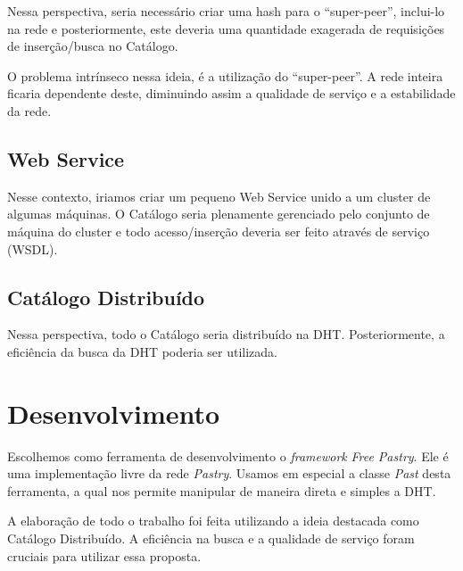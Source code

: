 \documentclass{acm_proc_article-sp}
\begin{document}
Nessa perspectiva, seria necessário criar uma hash para o “super-peer”, inclui-lo na rede e posteriormente, este deveria uma quantidade exagerada de requisições de inserção/busca no Catálogo.

O problema intrínseco nessa ideia, é a utilização do “super-peer”. A rede inteira ficaria dependente deste, diminuindo assim a qualidade de serviço e a estabilidade da rede.

\subsection{Web Service}

Nesse contexto, iriamos criar um pequeno Web Service unido a um cluster de algumas máquinas. O Catálogo seria plenamente gerenciado pelo conjunto de máquina do cluster e todo acesso/inserção deveria ser feito através de serviço (WSDL).

\subsection{Catálogo Distribuído}

Nessa perspectiva, todo o Catálogo seria distribuído na DHT. Posteriormente, a 
eficiência da  busca da DHT poderia ser utilizada.

\section{Desenvolvimento}

Escolhemos como ferramenta de desenvolvimento o \textit{framework} \textit{Free Pastry}. Ele é uma implementação livre da rede \textit{Pastry}. Usamos em especial a classe \textit{Past} desta ferramenta, a qual nos permite manipular de maneira direta e simples a DHT.

A elaboração de todo o trabalho foi feita utilizando a ideia destacada como Catálogo Distribuído. A eficiência na busca e a qualidade de serviço foram cruciais para utilizar essa proposta.
\end{document}
